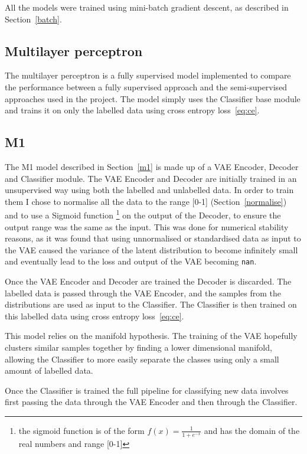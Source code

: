 All the models were trained using mini-batch gradient descent, as described in Section~\ref{batch}.

\subsection{Multilayer perceptron}
The multilayer perceptron is a fully supervised model implemented to compare the performance between a fully supervised approach and the 
semi-supervised approaches used in the project. The model simply uses the Classifier base module and trains it on only the labelled data
using cross entropy loss~\eqref{eq:ce}.

\subsection{M1}
The M1 model described in Section~\ref{m1} is made up of a VAE Encoder,
Decoder and Classifier 
module. The VAE Encoder and Decoder are initially trained in an unsupervised way using both the labelled and unlabelled data. In order 
to train them I chose to normalise all the data to the range [0-1] (Section~\ref{normalise}) and to use a Sigmoid function 
\footnote{the sigmoid function is of
the form $f(x) = \frac{1}{1+e^{-x}}$ and has the domain of the real numbers and range [0-1]} on the output of the Decoder, to ensure the output range 
was the same as the input. This was done for numerical stability reasons, as it was found that using unnormalised or standardised data 
as input to the VAE caused the variance of the latent distribution to become infinitely small and eventually lead to the loss and 
output of the VAE becoming \texttt{nan}.

Once the VAE Encoder and Decoder are trained the Decoder is discarded. The labelled data is passed through the VAE Encoder, and the samples
from the distributions are used as input to the Classifier. The Classifier is then trained on this labelled data using cross entropy 
loss~\eqref{eq:ce}. 

This model relies on the manifold hypothesis. The training of the VAE hopefully clusters similar samples together by finding a lower
dimensional manifold, allowing the Classifier to more easily separate the classes using only a small amount of labelled data.

Once the Classifier is trained the full pipeline for classifying new data involves first passing the data 
through the VAE Encoder and then through the Classifier.

